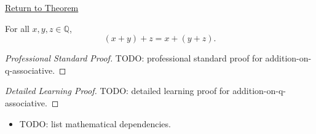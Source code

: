 \newpage
{}
\label{prf:addition-on-q-associative}

\begin{remark*}[Return]
\hyperref[thm:addition-on-q-associative]{Return to Theorem}
\end{remark*}

\begin{theorem*}
For all $x,y,z\in\mathbb{Q}$,
\[
(x+y)+z=x+(y+z).
\]
\end{theorem*}

\begin{proof}[Professional Standard Proof]
\LRAProofBodyStart
TODO: professional standard proof for addition-on-q-associative.
\end{proof}

\begin{proof}[Detailed Learning Proof]
\LRAProofBodyStart
TODO: detailed learning proof for addition-on-q-associative.
\end{proof}

\begin{remark*}
\end{remark*}

\begin{dependencies}
\begin{itemize}
  \item TODO: list mathematical dependencies.
\end{itemize}
\end{dependencies}

\clearpage
